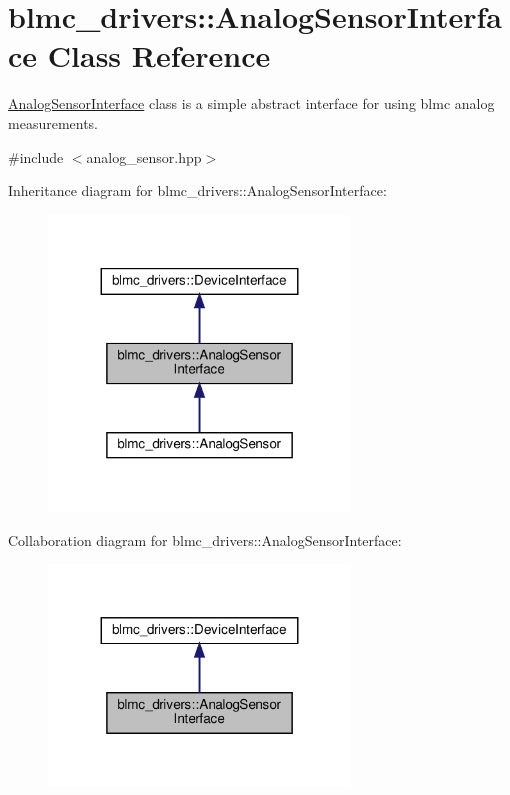 \hypertarget{classblmc__drivers_1_1AnalogSensorInterface}{}\section{blmc\+\_\+drivers\+:\+:Analog\+Sensor\+Interface Class Reference}
\label{classblmc__drivers_1_1AnalogSensorInterface}


\hyperlink{classblmc__drivers_1_1AnalogSensorInterface}{Analog\+Sensor\+Interface} class is a simple abstract interface for using blmc analog measurements.  




{\ttfamily \#include $<$analog\+\_\+sensor.\+hpp$>$}



Inheritance diagram for blmc\+\_\+drivers\+:\+:Analog\+Sensor\+Interface\+:
\nopagebreak
\begin{figure}[H]
\begin{center}
\leavevmode
\includegraphics[width=227pt]{classblmc__drivers_1_1AnalogSensorInterface__inherit__graph}
\end{center}
\end{figure}


Collaboration diagram for blmc\+\_\+drivers\+:\+:Analog\+Sensor\+Interface\+:
\nopagebreak
\begin{figure}[H]
\begin{center}
\leavevmode
\includegraphics[width=227pt]{classblmc__drivers_1_1AnalogSensorInterface__coll__graph}
\end{center}
\end{figure}
